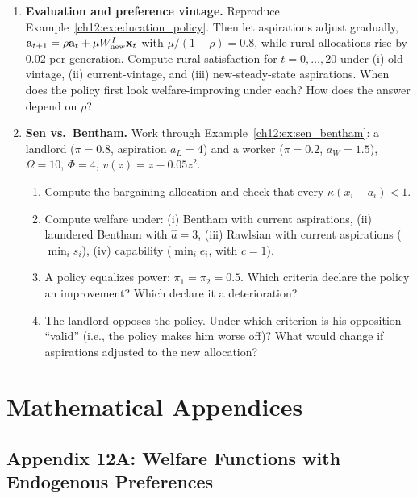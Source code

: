 \documentclass[../structural_economics_book.tex]{subfiles}
\begin{document}
\begin{enumerate}[label=\textbf{12.\arabic*}, leftmargin=3em]
\item \textbf{Evaluation and preference vintage.} Reproduce Example~\ref{ch12:ex:education_policy}. Then let aspirations adjust gradually, $\mathbf{a}_{t+1} = \rho\mathbf{a}_t + \mu W^I_{\text{new}}\mathbf{x}_t$ with $\mu/(1-\rho) = 0.8$, while rural allocations rise by $0.02$ per generation. Compute rural satisfaction for $t = 0, \ldots, 20$ under (i) old-vintage, (ii) current-vintage, and (iii) new-steady-state aspirations. When does the policy first look welfare-improving under each? How does the answer depend on $\rho$?

\item \textbf{Sen vs.\ Bentham.} Work through Example~\ref{ch12:ex:sen_bentham}: a landlord ($\pi = 0.8$, aspiration $a_L = 4$) and a worker ($\pi = 0.2$, $a_W = 1.5$), $\Omega = 10$, $\Phi = 4$, $v(z) = z - 0.05z^2$.
\begin{enumerate}
\item Compute the bargaining allocation and check that every $\kappa(x_i - a_i) < 1$.
\item Compute welfare under: (i) Bentham with current aspirations, (ii) laundered Bentham with $\hat{a} = 3$, (iii) Rawlsian with current aspirations ($\min_i s_i$), (iv) capability ($\min_i e_i$, with $c = 1$).
\item A policy equalizes power: $\pi_1 = \pi_2 = 0.5$. Which criteria declare the policy an improvement? Which declare it a deterioration?
\item The landlord opposes the policy. Under which criterion is his opposition ``valid'' (i.e., the policy makes him worse off)? What would change if aspirations adjusted to the new allocation?
\end{enumerate}
\end{enumerate}


\newpage
\section*{Mathematical Appendices}


\subsection*{Appendix 12A: Welfare Functions with Endogenous Preferences}
\label{ch12:app:welfare}
\end{document}
